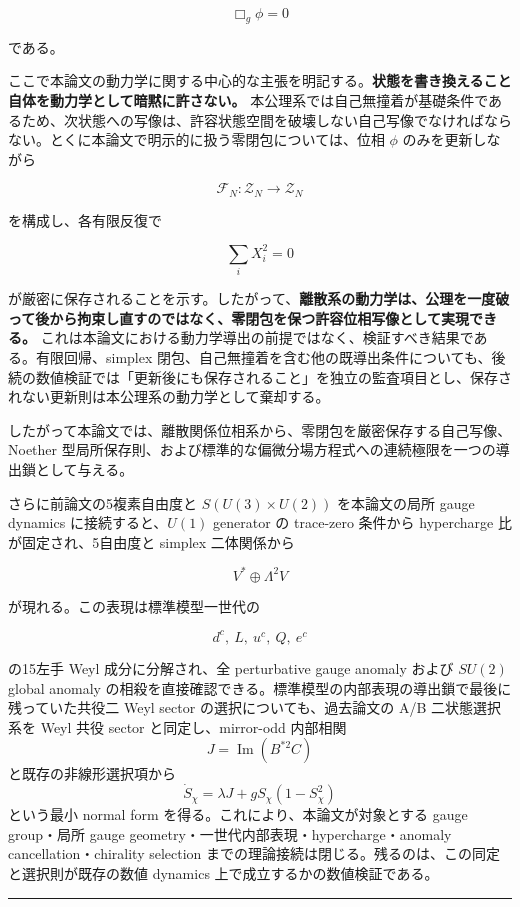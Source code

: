 \documentclass[
  a4paper,
]{ltjsarticle}
\begin{document}
\[
\boxed{
\Box_g\phi=0
}
\]

である。

ここで本論文の動力学に関する中心的な主張を明記する。\textbf{状態を書き換えること自体を動力学として暗黙に許さない。}
本公理系では自己無撞着が基礎条件であるため、次状態への写像は、許容状態空間を破壊しない自己写像でなければならない。とくに本論文で明示的に扱う零閉包については、位相
\(\phi\) のみを更新しながら

\[
\boxed{
\mathcal F_N:\mathcal Z_N\to\mathcal Z_N
}
\]

を構成し、各有限反復で

\[
\sum_iX_i^2=0
\]

が厳密に保存されることを示す。したがって、\textbf{離散系の動力学は、公理を一度破って後から拘束し直すのではなく、零閉包を保つ許容位相写像として実現できる。}
これは本論文における動力学導出の前提ではなく、検証すべき結果である。有限回帰、simplex
閉包、自己無撞着を含む他の既導出条件についても、後続の数値検証では「更新後にも保存されること」を独立の監査項目とし、保存されない更新則は本公理系の動力学として棄却する。

したがって本論文では、離散関係位相系から、零閉包を厳密保存する自己写像、Noether
型局所保存則、および標準的な偏微分場方程式への連続極限を一つの導出鎖として与える。

さらに前論文の5複素自由度と \(S(U(3)\times U(2))\) を本論文の局所 gauge
dynamics に接続すると、\(U(1)\) generator の trace-zero 条件から
hypercharge 比が固定され、5自由度と simplex 二体関係から

\[
V^*\oplus\Lambda^2V
\]

が現れる。この表現は標準模型一世代の

\[
d^c,\ L,\ u^c,\ Q,\ e^c
\]

の15左手 Weyl 成分に分解され、全 perturbative gauge anomaly および
\(SU(2)\) global anomaly
の相殺を直接確認できる。標準模型の内部表現の導出鎖で最後に残っていた共役二
Weyl sector の選択についても、過去論文の A/B 二状態選択系を Weyl 共役
sector と同定し、mirror-odd 内部相関 \[
J=\operatorname{Im}(B^{*2}C)
\] と既存の非線形選択項から \[
\dot S_\chi=\lambda J+gS_\chi(1-S_\chi^2)
\] という最小 normal form を得る。これにより、本論文が対象とする gauge
group・局所 gauge geometry・一世代内部表現・hypercharge・anomaly
cancellation・chirality selection
までの理論接続は閉じる。残るのは、この同定と選択則が既存の数値 dynamics
上で成立するかの数値検証である。

\begin{center}\rule{0.5\linewidth}{0.5pt}\end{center}
\end{document}
